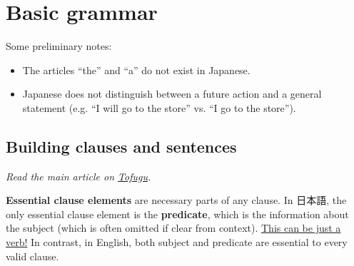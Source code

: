 \documentclass[../nihongo-gakushuu-kyouzai.tex]{subfiles}
\begin{document}
\onehalfspacing  %

\section{Basic grammar}
Some preliminary notes:
\begin{itemize}
    \item The articles ``the'' and ``a'' do not exist in Japanese.
    \item Japanese does not distinguish between a future action and a general statement (e.g. ``I
    will go to the store'' vs. ``I go to the store'').
\end{itemize}

\subsection{Building clauses and sentences}
\emph{Read the main article on \href{https://www.tofugu.com/japanese-grammar/sentences-and-clauses/}{Tofugu}.}

\textbf{Essential clause elements} are necessary parts of any clause. In 日本語, the only essential clause element is the \textbf{predicate}, which is the information about the subject (which is often omitted if clear from context). \ul{This can be just a verb!} In contrast, in English, both subject and predicate are essential to every valid clause.
\end{document}
